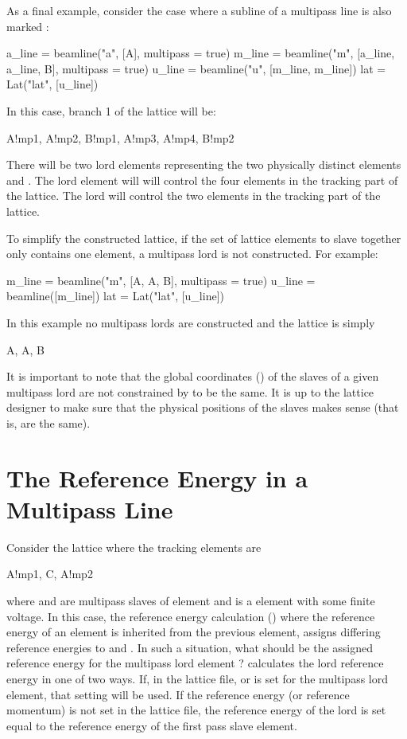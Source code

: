 As a final example, consider the case where a subline of a multipass line is also marked
:
\begin{example}
  a_line = beamline("a", [A], multipass = true)
  m_line = beamline("m", [a_line, a_line, B], multipass = true)
  u_line = beamline("u", [m_line, m_line])
  lat = Lat("lat", [u_line])
\end{example}
In this case, branch 1 of the lattice will be:
\begin{example}
  A!mp1, A!mp2, B!mp1, A!mp3, A!mp4, B!mp2
\end{example}
There will be two lord elements representing the two physically distinct elements  and .
The  lord element will will control the four  elements in the tracking
part of the lattice. The  lord will control the two  elements in the tracking part
of the lattice. 

To simplify the constructed lattice, if the set of lattice elements to slave together only contains
one element, a multipass lord is not constructed. For example:
\begin{example}
  m_line = beamline("m", [A, A, B], multipass = true)
  u_line = beamline([m_line])
  lat = Lat("lat", [u_line])
\end{example}
In this example no multipass lords are constructed and the lattice is simply
\begin{example}
  A, A, B
\end{example}

It is important to note that the global coordinates () of the slaves of a given
multipass lord are not constrained by \accellat to be the same. It is up to the lattice designer to make
sure that the physical positions of the slaves makes sense (that is, are the same).

\section{The Reference Energy in a Multipass Line}
\label{s:ref.e.multi}

Consider the lattice where the tracking elements are
\begin{example}
  A!mp1, C, A!mp2
\end{example}
where  and  are multipass slaves of element  and  is a 
element with some finite voltage. In this case, the reference energy calculation ()
where the reference energy of an element is inherited from the previous element, assigns differing
reference energies to  and . In such a situation, what should be the assigned
reference energy for the multipass lord element ? \accellat calculates the lord reference energy
in one of two ways. If, in the lattice file,  or  is set for the multipass lord
element, that setting will be used. If the reference energy (or reference momentum) is not set in the lattice
file, the reference energy of the lord is set equal to the reference energy of the first pass slave
element.
